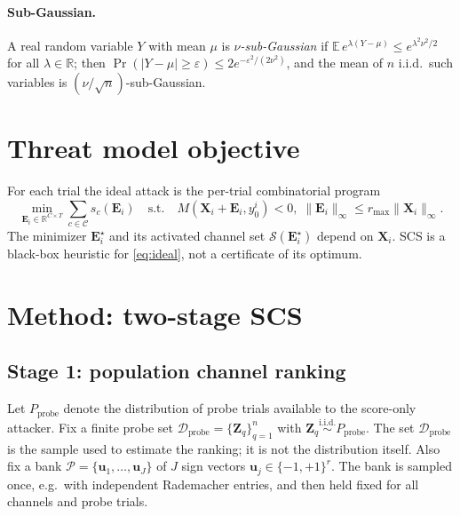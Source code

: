\documentclass[11pt]{article}
\begin{document}
\paragraph{Sub-Gaussian.}
A real random variable $Y$ with mean $\mu$ is \emph{$\nu$-sub-Gaussian} if
$\mathbb{E}\,e^{\lambda(Y-\mu)}\le e^{\lambda^2\nu^2/2}$ for all $\lambda\in\mathbb{R}$;
then $\Pr(|Y-\mu|\ge\varepsilon)\le 2e^{-\varepsilon^2/(2\nu^2)}$, and the mean of $n$
i.i.d.\ such variables is $(\nu/\sqrt n)$-sub-Gaussian.

\section{Threat model objective}

For each trial the ideal attack is the per-trial combinatorial program
\begin{equation}\label{eq:ideal}
\min_{\mathbf{E}_i\in\mathbb{R}^{C\times T}} \sum_{c\in\mathcal{C}}s_c(\mathbf{E}_i)
\quad\text{s.t.}\quad M(\mathbf{X}_i+\mathbf{E}_i,y_0^i)<0,\;
\|\mathbf{E}_i\|_\infty\le r_{\max}\|\mathbf{X}_i\|_\infty .
\end{equation}
The minimizer $\mathbf{E}_i^\star$ and its activated channel set
$\mathcal{S}(\mathbf{E}_i^\star)$ depend on $\mathbf{X}_i$.
SCS is a black-box heuristic for \eqref{eq:ideal}, not a certificate of its optimum.

\section{Method: two-stage SCS}

\subsection{Stage 1: population channel ranking}
Let $P_{\mathrm{probe}}$ denote the distribution of probe trials available to the
score-only attacker. Fix a finite probe set
$\mathcal{D}_{\mathrm{probe}}=\{\mathbf{Z}_q\}_{q=1}^{n}$ with
$\mathbf{Z}_q\stackrel{\mathrm{i.i.d.}}{\sim}P_{\mathrm{probe}}$. The set
$\mathcal{D}_{\mathrm{probe}}$ is the sample used to estimate the ranking; it is not the
distribution itself. Also fix a bank
$\mathcal{P}=\{\mathbf{u}_1,\dots,\mathbf{u}_{J}\}$ of $J$ sign vectors
$\mathbf{u}_j\in\{-1,+1\}^{r}$. The bank is sampled once, e.g.\ with independent
Rademacher entries, and then held fixed for all channels and probe trials.
\end{document}
